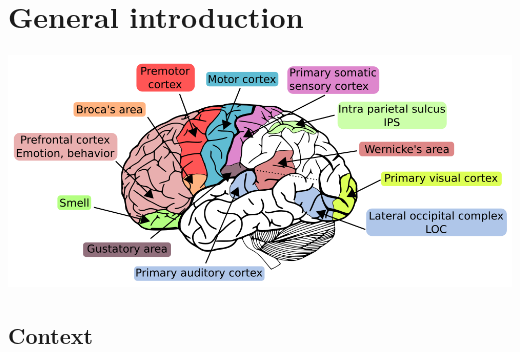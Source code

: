 \chapter{General introduction}
\label{chap:intro}

\minitoc

 \begin{pagefigure}
    \centering
    \def\svgwidth{.23\columnwidth}
    
    \includegraphics[width=.74\linewidth]{figures/brain_function.png}    
    \caption{\textbf{Views of the brain} at different levels of detail. The brain is composed of (spatially connected) regions and  such regions are in turn composed of populations of neurons.
\textbf{Left:} Simplified view of a neuron.
A neuron (there are many types) has a cell body
called the \textit{soma}, many regions for receiving information from other neural cells
called \textit{dendrites}, and often an \textit{axon} (nerve
fiber) for transmitting information to other
cells (an axon can be longer than 1 meter in humans).
The information in the axon is transmitted through an electrical
signal called action potential, which is based on the electrical
properties of the neuronal membrane. Adapted from
\url{http://commons.wikimedia.org/}.
%      
\textbf{Right:} Each region is associated with a particular function
such as sensory areas (e.g.  visual cortex, auditory cortex) that
receive and process information from sensory organs, motors areas
(e.g. primary motor cortex, premotor cortex) that control the
movements of the subject, and associative areas (e.g. Broca’s area,
Wernicke's area) that process the high-level information related to
language production and understanding or the Intra Parietal Sulcus
--IPS-- that processes spatial information.
Adapted from \url{http://agaudi.files.wordpress.com/}.
}
\label{fig:neuron}
\end{pagefigure}

\section{Context}

